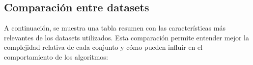 





\subsection{Comparación entre datasets}\label{subsec:comparacion-entre-datasets}
A continuación, se muestra una tabla resumen con las características más relevantes de los datasets utilizados.
Esta comparación permite entender mejor la complejidad relativa de cada conjunto y cómo pueden influir en el comportamiento de los algoritmos:

